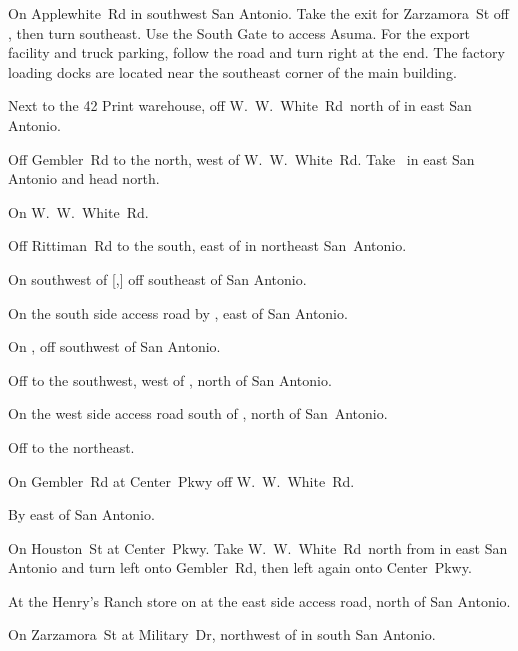 
\newcommand*{\WWWhiteRd}{W\!.~W\!.~White~Rd}

\begin{LocationList}

On Applewhite~Rd in southwest San Antonio.
Take the exit for Zarzamora~St off , then turn southeast.
Use the South Gate to access Asuma.
For the export facility and truck parking, follow the road and turn right at the end.
The factory loading docks are located near the southeast corner of the main building.

Next to the 42 Print warehouse, off  \WWWhiteRd\ north of   in east San Antonio.

Off Gembler~Rd to the north, west of  \WWWhiteRd.
Take~  in east San Antonio and head north.

\Location{\GarageHQ \Garage}
On  \WWWhiteRd.

Off Rittiman~Rd to the south, east of  in northeast San~Antonio.

On  southwest of [,] off  southeast of San Antonio.

On the south side  access road by , east of San Antonio.

On , off  southwest of San Antonio.

Off  to the southwest, west of , north of San Antonio.

On the west side  access road south of , north of San~Antonio.

Off   to the northeast.

\Location{\RecruitmentAgency \Recruitment}
On Gembler~Rd at Center~Pkwy off  \WWWhiteRd.

\Location{\TruckStop \Gas \Rest \Service \Weigh}
By   east of San Antonio.

On Houston~St at Center~Pkwy.
Take  \WWWhiteRd\ north from   in east San Antonio and turn left onto Gembler~Rd, then left again onto Center~Pkwy.

At the Henry's Ranch store on  at the east side  access road, north of San Antonio.

On Zarzamora~St at  Military~Dr, northwest of   in south San Antonio.

\end{LocationList}
